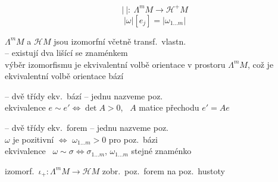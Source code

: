 \begin{minipage}{0.55\textwidth}
\begin{definice}
\[
  |\ |:\ \Lambda^mM \to \mathcal{H}^+M
\]
\[
  |\omega|[e_j] = |\omega_{1\dots m}|
\]
\end{definice}
\end{minipage}
\hfill
\begin{minipage}{0.4\textwidth}
\end{minipage}

$\Lambda^mM$ a $\mathcal{H}M$ jsou izomorfní včetně transf.\ vlastn. \\
\quad {} -- existují dva lišící se znaménkem \\
výběr izomorfismu je ekvivalentní volbě orientace v prostoru $\Lambda^mM$, což je ekvivalentní volbě orientace bází

\begin{definice}[Orientace]
 -- dvě třídy ekv.\ bází -- jednu nazveme poz. \\
\quad ekvivalence $e\sim e' \Leftrightarrow \det A > 0$, \ $A$ matice přechodu $e' = Ae$

 -- dvě třídy ekv.\ forem -- jednu nazveme poz. \\
\quad $\omega$ je pozitivní $\Leftrightarrow$ $\omega_{1\dots m} > 0$ pro poz.\ bázi \\
\quad ekvivalence \ $\omega \sim \sigma \Leftrightarrow \sigma_{1\dots m}$, $\omega_{1\dots m}$ stejné znaménko
\end{definice}

izomorf.\ $\iota_+:\Lambda^mM\to\mathcal{H}M$ \quad zobr.\ poz.\ forem na poz.\ hustoty

